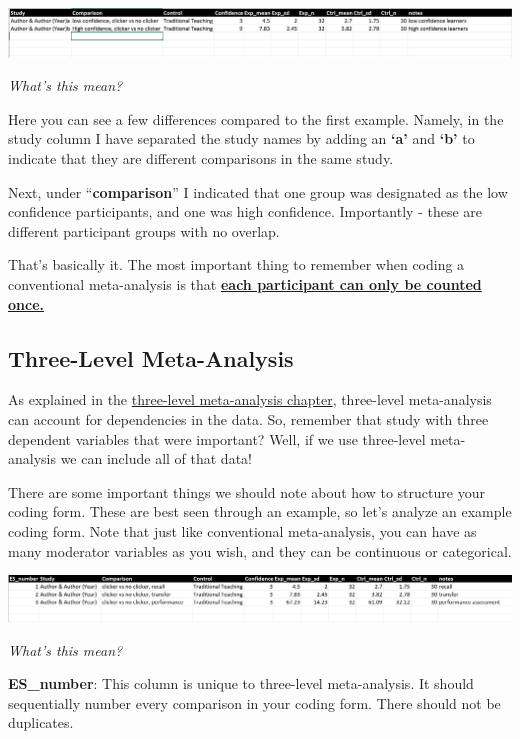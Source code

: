 \documentclass[
]{book}
\begin{document}
\includegraphics[width=2\textwidth,height=\textheight]{images/meta2.PNG}

\emph{What's this mean?}

Here you can see a few differences compared to the first example. Namely, in the study column I have separated the study names by adding an \textbf{`a'} and \textbf{`b'} to indicate that they are different comparisons in the same study.

Next, under ``\textbf{comparison}'' I indicated that one group was designated as the low confidence participants, and one was high confidence. Importantly - these are different participant groups with no overlap.

That's basically it. The most important thing to remember when coding a conventional meta-analysis is that \ul{\textbf{each participant can only be counted once.}}

\hypertarget{three-level-meta-analysis}{%
\subsection{Three-Level Meta-Analysis}\label{three-level-meta-analysis}}

As explained in the \protect\hyperlink{cross3LMA}{three-level meta-analysis chapter}, three-level meta-analysis can account for dependencies in the data. So, remember that study with three dependent variables that were important? Well, if we use three-level meta-analysis we can include all of that data!

There are some important things we should note about how to structure your coding form. These are best seen through an example, so let's analyze an example coding form. Note that just like conventional meta-analysis, you can have as many moderator variables as you wish, and they can be continuous or categorical.

\includegraphics[width=2\textwidth,height=\textheight]{images/3lmacoding.PNG}

\emph{What's this mean?}

\textbf{ES\_number}: This column is unique to three-level meta-analysis. It should sequentially number every comparison in your coding form. There should not be duplicates.
\end{document}
